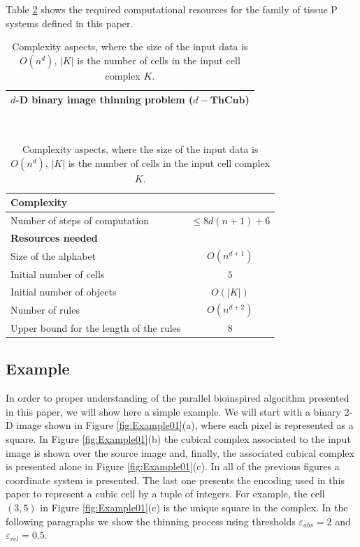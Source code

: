 \documentclass[journal]{IEEEtran}
\begin{document}
Table \ref{table: Complexity Aspects} shows the required computational resources for the family of tissue P systems defined
in this paper.
\begin{table}[t!]
\begin{center}
\begin{tabular}{|c|}
\hline
$d$-D binary image thinning problem ($d-\mathbf{ThCub}$)\\
\hline
\end{tabular}\\
\begin{tabular}{|l|c|}
	\hline
	\textbf{Complexity}                     &  \\ 
	\hline
	Number of steps of computation          & $\leq 8d(n+1)+6$ \\ 
	\hline\hline
	\textbf{Resources needed}               &  \\ 
	\hline
	Size of the alphabet                    &   $O(n^{d+1})$   \\
	Initial number of cells                 &       $5$        \\
	Initial number of objects               &     $O(|K|)$     \\
	Number of rules                         &   $O(n^{d+2})$   \\
	Upper bound for the length of the rules &       $8$        \\ 
	\hline
\end{tabular}\caption{Complexity aspects, where the size of the input data is $O(n^d)$,
$|K|$ is the number of cells in the input cell complex $K$.}\label{table: Complexity Aspects}
\end{center}
\end{table}

\subsection{Example}
In order to proper understanding of the parallel bioinspired algorithm presented in this 
paper, we will show here a simple example. We will start with a binary 2-D image shown in
Figure \ref{fig:Example01}(a), where each pixel is represented as a square. In Figure 
\ref{fig:Example01}(b) the cubical complex associated to the input image is shown over the 
source image and, finally, the associated cubical complex is presented alone in Figure 
\ref{fig:Example01}(c). In all of the previous figures a coordinate system is presented. 
The last one presents the encoding used in this paper to represent a cubic cell by a tuple of 
integers. For example, the cell $(3,5)$ in Figure \ref{fig:Example01}(c) is the unique square in
the complex. In the following paragraphs we show the thinning process using thresholds 
$\varepsilon_{abs}=2$ and $\varepsilon_{rel}=0.5$.
 
\end{document}
